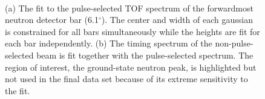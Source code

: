 \begin{figure}[!htbp]
\centering
{}\\
\caption[Functional fit to the pulse-selected timing spectrum.]{(a) The fit to the pulse-selected TOF spectrum of the forwardmost neutron detector bar (6.1$^{\circ}$).  The center and width of each gaussian is constrained for all bars simultaneously while the heights are fit for each bar independently.  (b) The timing spectrum of the non-pulse-selected beam is fit together with the pulse-selected spectrum.  The region of interest, the ground-state neutron peak, is highlighted but not used in the final data set because of its extreme sensitivity to the fit.}
\label{fig:continuumModel}
\end{figure}


